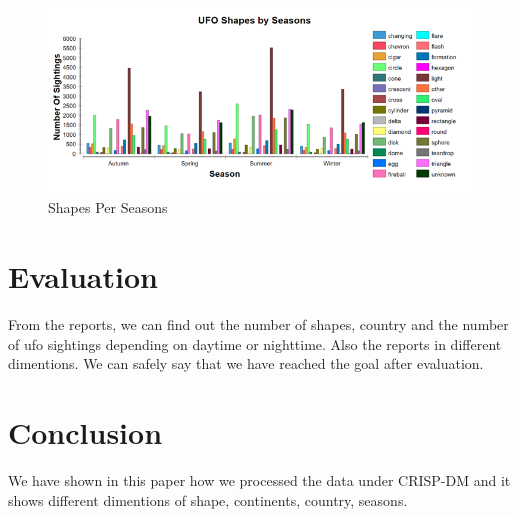 \documentclass[11pt, journal]{IEEEtran}
\begin{document}
\begin{itemize}
\begin{figure}[htb]
            \label{fig:shape-continent}
        \end{figure}
        \begin{figure}[htb]
            \centering
                \includegraphics[width=1.0\columnwidth]{images/shapes-seasons}
            \caption{Shapes Per Seasons}
            \label{fig:shape-season}
        \end{figure}
\end{itemize}


\section{Evaluation} \label{sec:Evaluation}
From the reports, we can find out the number of shapes, country and the number of ufo sightings depending on daytime or nighttime. Also the reports in different dimentions. We can safely say that we have reached the goal after evaluation.

\section{Conclusion} \label{sec:concl}
We have shown in this paper how we processed the data under CRISP-DM and it shows different dimentions of shape, continents, country, seasons. 



\end{document}
